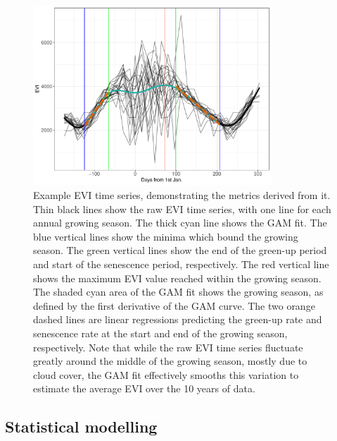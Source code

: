 \begin{refsection}
\begin{figure}[tb]
\centering
	\includegraphics[width=0.8\textwidth]{img/ts_example}
	\caption[Annotated EVI time series]{Example EVI time series, demonstrating the metrics derived from it. Thin black lines show the raw EVI time series, with one line for each annual growing season. The thick cyan line shows the GAM fit. The blue vertical lines show the minima which bound the growing season. The green vertical lines show the end of the green-up period and start of the senescence period, respectively. The red vertical line shows the maximum EVI value reached within the growing season. The shaded cyan area of the GAM fit shows the growing season, as defined by the first derivative of the GAM curve. The two orange dashed lines are linear regressions predicting the green-up rate and senescence rate at the start and end of the growing season, respectively. Note that while the raw EVI time series fluctuate greatly around the middle of the growing season, mostly due to cloud cover, the GAM fit effectively smooths this variation to estimate the average EVI over the 10 years of data.}
	\label{phen:ts_example}
\end{figure}

\subsection{Statistical modelling}
\label{phen:ssec:models}


\end{refsection}
